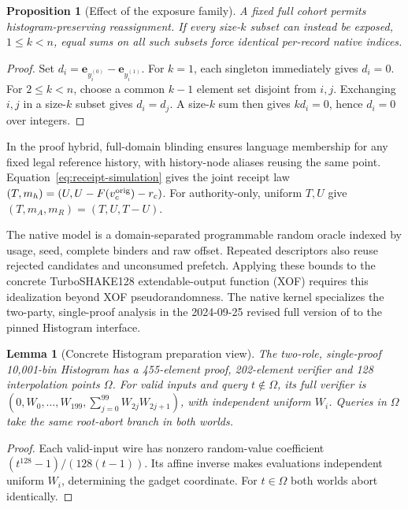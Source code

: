 \documentclass[conference,compsoc]{IEEEtran}
\theoremstyle{definition}
\numberwithin{equation}{section}
\numberwithin{table}{section}
\numberwithin{figure}{section}
\theoremstyle{plain}
\newtheorem{lemma}{Lemma}[section]
\newtheorem{proposition}{Proposition}[section]
\newtheorem{lemma}{Lemma}
\newtheorem{proposition}{Proposition}
\begin{document}
\begin{proposition}[Effect of the exposure family]
\label{prop:exposure-family}
A fixed full cohort permits histogram-preserving reassignment. If every
size-\(k\) subset can instead be exposed, \(1\le k<n\), equal sums on
all such subsets force identical per-record native indices.
\end{proposition}
\begin{proof}
Set \(d_i=\mathbf e_{y_i^{(0)}}-\mathbf e_{y_i^{(1)}}\).
For \(k=1\), each singleton immediately gives \(d_i=0\). For \(2\le k<n\),
choose a common \(k-1\) element set disjoint from \(i,j\). Exchanging \(i,j\) in a size-\(k\) subset gives \(d_i=d_j\).
A size-\(k\) sum then gives \(kd_i=0\), hence \(d_i=0\) over integers.
\end{proof}

\label{lem:pedersen-language-lifting}
In the proof hybrid, full-domain blinding ensures language membership for any fixed legal
reference history, with history-node aliases reusing the same point.
\label{lem:receipt-coupling}
Equation~\eqref{eq:receipt-simulation} gives the joint receipt law
\((T,m_h)=(U,U-F(v_c^{\rm orig})-r_c)\). For authority-only,
uniform \(T,U\) give \((T,m_A,m_R)=(T,U,T-U)\).

The native model is a domain-separated programmable random oracle indexed by
usage, seed, complete binders and raw offset. Repeated descriptors also reuse rejected
candidates and unconsumed prefetch. Applying these bounds to the concrete
TurboSHAKE128 extendable-output function (XOF) requires this idealization beyond XOF pseudorandomness.
The native kernel specializes the two-party, single-proof analysis in the
2024-09-25 revised full version of \cite{Davis2023VDAFPrivacy} to the
pinned Histogram interface.

\begin{lemma}[Concrete Histogram preparation view]
\label{lem:concrete-histogram-view}
The two-role, single-proof 10,001-bin Histogram has a 455-element proof,
202-element verifier and 128 interpolation points \(\Omega\).
For valid inputs and query \(t\notin\Omega\), its full verifier is
\((0,W_0,\ldots,W_{199},\sum_{j=0}^{99}W_{2j}W_{2j+1})\), with
independent uniform \(W_i\). Queries in \(\Omega\) take the same root-abort
branch in both worlds.
\end{lemma}
\begin{proof}
Each valid-input wire has nonzero random-value coefficient
\((t^{128}-1)/(128(t-1))\). Its affine inverse makes evaluations
independent uniform \(W_i\), determining the gadget coordinate.
For \(t\in\Omega\) both worlds abort identically.
\end{proof}
\end{document}

